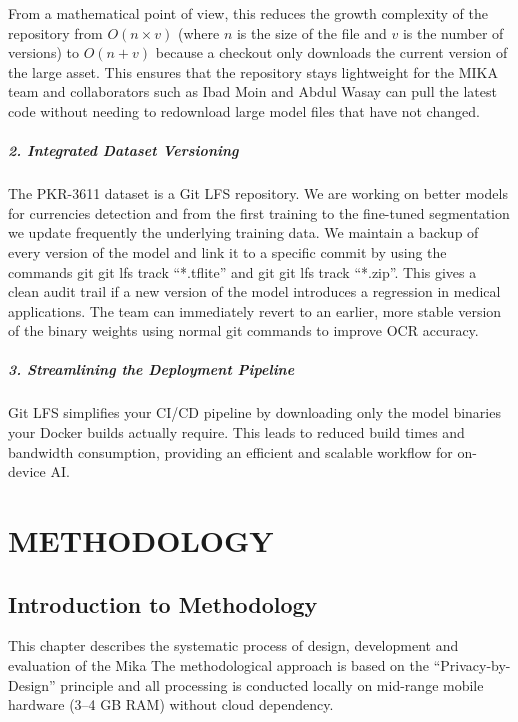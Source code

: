 \documentclass[12pt,a4paper]{report}
\begin{document}
\noindent From a mathematical point of view, this reduces the growth complexity of the repository from $O(n \times v)$ (where $n$ is the size of the file and $v$ is the number of versions) to $O(n + v)$ because a checkout only downloads the current version of the large asset. This ensures that the repository stays lightweight for the MIKA team and collaborators such as Ibad Moin and Abdul Wasay can pull the latest code without needing to redownload large model files that have not changed.
 
\paragraph{2. Integrated Dataset Versioning}
The PKR-3611 dataset is a Git LFS repository. We are working on better models for currencies detection and from the first training to the fine-tuned segmentation we update frequently the underlying training data. We maintain a backup of every version of the model and link it to a specific commit by using the commands git git lfs track “*.tflite” and git git lfs track “*.zip”. This gives a clean audit trail if a new version of the model introduces a regression in medical applications. The team can immediately revert to an earlier, more stable version of the binary weights using normal git commands to improve OCR accuracy.

\paragraph{3. Streamlining the Deployment Pipeline}
Git LFS simplifies your CI/CD pipeline by downloading only the model binaries your Docker builds actually require. This leads to reduced build times and bandwidth consumption, providing an efficient and scalable workflow for on-device AI.

\chapter{METHODOLOGY}
 
\section{Introduction to Methodology}
This chapter describes the systematic process of design, development and evaluation of the
Mika The methodological approach is based on the “Privacy-by-Design” principle and all processing is conducted locally on mid-range mobile hardware (3–4 GB RAM) without cloud dependency.
\end{document}
